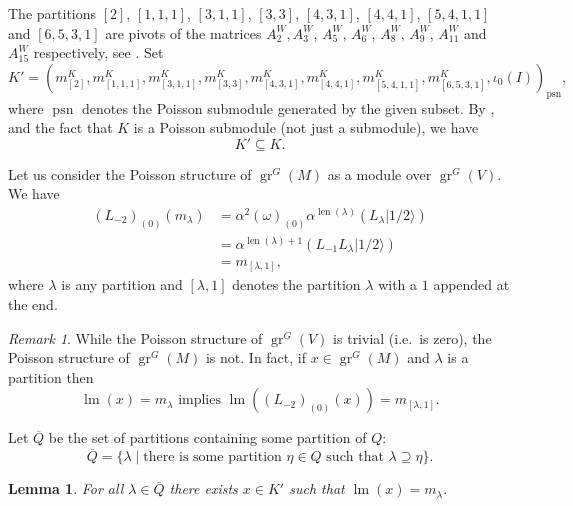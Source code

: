 \documentclass[12pt, reqno]{amsart}
\newtheorem{lemma}[theorem]{Lemma}
\theoremstyle{remark}
\newtheorem{remark}[theorem]{Remark}
\DeclareMathOperator{\gr}{gr}
\DeclareMathOperator{\lm}{lm}
\DeclareMathOperator{\len}{len}
\DeclareMathOperator{\psn}{psn}
\newcommand{\vachalf}{|1/2\rangle}
\begin{document}
The partitions $[2]$, $[1, 1, 1]$, $[3, 1, 1]$, $[3, 3]$, $[4, 3, 1]$, $[4, 4, 1]$, $[5, 4, 1, 1]$ and $[6, 5, 3, 1]$ are pivots of the matrices $A^W_2, A^W_3$, $A^W_5$, $A^W_6$, $A^W_8$, $A^W_9$, $A^W_{11}$ and $A^W_{15}$ respectively, see \cite[ising-modules.ipynb]{sagemath2}.
Set
\begin{equation*}
  K' = (m^K_{[2]}, m^K_{[1, 1, 1]}, m^K_{[3, 1, 1]}, m^K_{[3, 3]}, m^K_{[4, 3, 1]}, m^K_{[4, 4, 1]}, m^K_{[5, 4, 1, 1]}, m^K_{[6, 5, 3, 1]}, \iota_0(I))_{\psn},
\end{equation*}
where $\psn$ denotes the Poisson submodule generated by the given subset.
By ,  and the fact that $K$ is a Poisson submodule (not just a submodule), we have
\begin{equation*}
K' \subseteq K.
\end{equation*}

Let us consider the Poisson structure of $\gr^G(M)$ as a module over $\gr^G(V)$.
We have
\begin{align*}
  (L_{-2})_{(0)}(m_\lambda) &= \alpha^2(\omega)_{(0)}\alpha^{\len(\lambda)}(L_\lambda\vachalf) \\
  &= \alpha^{\len(\lambda) + 1}(L_{-1}L_\lambda\vachalf) \\
  &= m_{[\lambda, 1]},
\end{align*}
where $\lambda$ is any partition and $[\lambda, 1]$ denotes the partition $\lambda$ with a $1$ appended at the end.

\begin{remark}
  \label{rmk:6}
  While the Poisson structure of $\gr^G(V)$ is trivial (i.e.\ is zero), the Poisson structure of $\gr^G(M)$ is not.
  In fact, if $x \in \gr^G(M)$ and $\lambda$ is a partition then
  \begin{equation*}
    \lm(x) = m_\lambda\text{ implies }\lm((L_{-2})_{(0)}(x)) = m_{[\lambda, 1]}.
  \end{equation*}
\end{remark}

Let $\overline{Q}$ be the set of partitions containing some partition of $Q$:
\begin{equation*}
  \overline{Q} = \{\lambda \mid \text{there is some partition }\eta \in Q\text{ such that }\lambda \supseteq \eta\}.
\end{equation*}

\begin{lemma}
  \label{lmm:10}
  For all $\lambda \in \overline{Q}$ there exists $x \in K'$ such that $\lm(x) = m_\lambda$.
\end{lemma}
\end{document}
